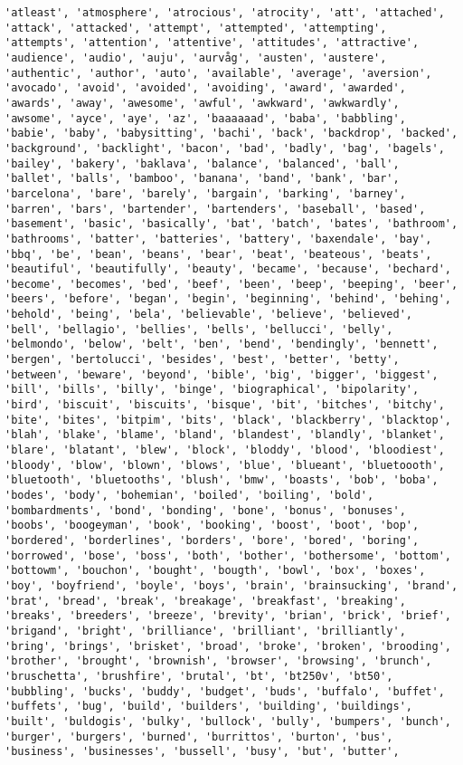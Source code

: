 \documentclass[11pt]{article}
\begin{document}
\begin{Verbatim}[commandchars=\\\{\}]
'atleast', 'atmosphere', 'atrocious', 'atrocity', 'att', 'attached', 'attack', 'attacked', 'attempt', 'attempted', 'attempting', 'attempts', 'attention', 'attentive', 'attitudes', 'attractive', 'audience', 'audio', 'auju', 'aurvåg', 'austen', 'austere', 'authentic', 'author', 'auto', 'available', 'average', 'aversion', 'avocado', 'avoid', 'avoided', 'avoiding', 'award', 'awarded', 'awards', 'away', 'awesome', 'awful', 'awkward', 'awkwardly', 'awsome', 'ayce', 'aye', 'az', 'baaaaaad', 'baba', 'babbling', 'babie', 'baby', 'babysitting', 'bachi', 'back', 'backdrop', 'backed', 'background', 'backlight', 'bacon', 'bad', 'badly', 'bag', 'bagels', 'bailey', 'bakery', 'baklava', 'balance', 'balanced', 'ball', 'ballet', 'balls', 'bamboo', 'banana', 'band', 'bank', 'bar', 'barcelona', 'bare', 'barely', 'bargain', 'barking', 'barney', 'barren', 'bars', 'bartender', 'bartenders', 'baseball', 'based', 'basement', 'basic', 'basically', 'bat', 'batch', 'bates', 'bathroom', 'bathrooms', 'batter', 'batteries', 'battery', 'baxendale', 'bay', 'bbq', 'be', 'bean', 'beans', 'bear', 'beat', 'beateous', 'beats', 'beautiful', 'beautifully', 'beauty', 'became', 'because', 'bechard', 'become', 'becomes', 'bed', 'beef', 'been', 'beep', 'beeping', 'beer', 'beers', 'before', 'began', 'begin', 'beginning', 'behind', 'behing', 'behold', 'being', 'bela', 'believable', 'believe', 'believed', 'bell', 'bellagio', 'bellies', 'bells', 'bellucci', 'belly', 'belmondo', 'below', 'belt', 'ben', 'bend', 'bendingly', 'bennett', 'bergen', 'bertolucci', 'besides', 'best', 'better', 'betty', 'between', 'beware', 'beyond', 'bible', 'big', 'bigger', 'biggest', 'bill', 'bills', 'billy', 'binge', 'biographical', 'bipolarity', 'bird', 'biscuit', 'biscuits', 'bisque', 'bit', 'bitches', 'bitchy', 'bite', 'bites', 'bitpim', 'bits', 'black', 'blackberry', 'blacktop', 'blah', 'blake', 'blame', 'bland', 'blandest', 'blandly', 'blanket', 'blare', 'blatant', 'blew', 'block', 'bloddy', 'blood', 'bloodiest', 'bloody', 'blow', 'blown', 'blows', 'blue', 'blueant', 'bluetoooth', 'bluetooth', 'bluetooths', 'blush', 'bmw', 'boasts', 'bob', 'boba', 'bodes', 'body', 'bohemian', 'boiled', 'boiling', 'bold', 'bombardments', 'bond', 'bonding', 'bone', 'bonus', 'bonuses', 'boobs', 'boogeyman', 'book', 'booking', 'boost', 'boot', 'bop', 'bordered', 'borderlines', 'borders', 'bore', 'bored', 'boring', 'borrowed', 'bose', 'boss', 'both', 'bother', 'bothersome', 'bottom', 'bottowm', 'bouchon', 'bought', 'bougth', 'bowl', 'box', 'boxes', 'boy', 'boyfriend', 'boyle', 'boys', 'brain', 'brainsucking', 'brand', 'brat', 'bread', 'break', 'breakage', 'breakfast', 'breaking', 'breaks', 'breeders', 'breeze', 'brevity', 'brian', 'brick', 'brief', 'brigand', 'bright', 'brilliance', 'brilliant', 'brilliantly', 'bring', 'brings', 'brisket', 'broad', 'broke', 'broken', 'brooding', 'brother', 'brought', 'brownish', 'browser', 'browsing', 'brunch', 'bruschetta', 'brushfire', 'brutal', 'bt', 'bt250v', 'bt50', 'bubbling', 'bucks', 'buddy', 'budget', 'buds', 'buffalo', 'buffet', 'buffets', 'bug', 'build', 'builders', 'building', 'buildings', 'built', 'buldogis', 'bulky', 'bullock', 'bully', 'bumpers', 'bunch', 'burger', 'burgers', 'burned', 'burrittos', 'burton', 'bus', 'business', 'businesses', 'bussell', 'busy', 'but', 'butter', 
\end{Verbatim}
\end{document}
